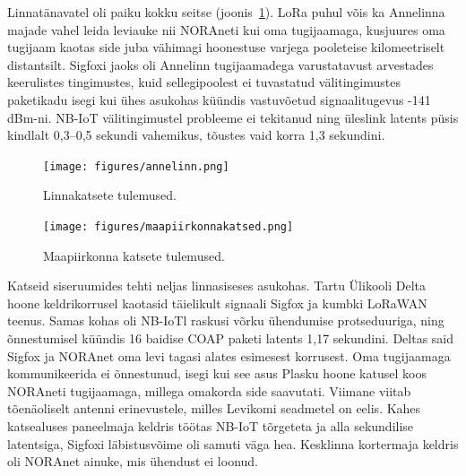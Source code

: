 \documentclass[12pt]{article}
\begin{document}
    Linnatänavatel oli paiku kokku seitse (joonis~\ref{fig:annelinn}).
    LoRa puhul võis ka Annelinna majade vahel leida leviauke nii NORAneti kui oma tugijaamaga, kusjuures oma tugijaam kaotas side juba vähimagi hoonestuse varjega pooleteise kilomeetriselt distantsilt.
    Sigfoxi jaoks oli Annelinn tugijaamadega varustatavust arvestades keerulistes tingimustes, kuid sellegipoolest ei tuvastatud välitingimustes paketikadu isegi kui ühes asukohas küündis vastuvõetud signaalitugevus -141 dBm-ni.
    NB-IoT välitingimustel probleeme ei tekitanud ning üleslink latents püsis kindlalt 0,3--0,5 sekundi vahemikus, tõustes vaid korra 1,3 sekundini.

    \begin{figure} [p]
        \begin{center}
            \vspace*{-0.5cm}
            \texttt{[image: figures/annelinn.png]}
            \caption{Linnakatsete tulemused.}
            \label{fig:annelinn}
        \end{center}
    \end{figure}

    \begin{figure} [p]
        \begin{center}
            \vspace*{-0.5cm}
            \texttt{[image: figures/maapiirkonnakatsed.png]}
            \caption{Maapiirkonna katsete tulemused.}
            \label{fig:maapiirkonnakatsed}
        \end{center}
    \end{figure}

    Katseid siseruumides tehti neljas linnasiseses asukohas.
    Tartu Ülikooli Delta hoone keldrikorrusel kaotasid täielikult signaali Sigfox ja kumbki LoRaWAN teenus.
    Samas kohas oli NB-IoTl raskusi võrku ühendumise protseduuriga, ning õnnestumisel küündis 16 baidise COAP paketi latents 1,17 sekundini.
    Deltas said Sigfox ja NORAnet oma levi tagasi alates esimesest korrusest.
    Oma tugijaamaga kommunikeerida ei õnnestunud, isegi kui see asus Plasku hoone katusel koos NORAneti tugijaamaga, millega omakorda side saavutati.
    Viimane viitab tõenäoliselt antenni erinevustele, milles Levikomi seadmetel on eelis.
    Kahes katsealuses paneelmaja keldris töötas NB-IoT tõrgeteta ja alla sekundilise latentsiga, Sigfoxi läbistusvõime oli samuti väga hea.
    Kesklinna kortermaja keldris oli NORAnet ainuke, mis ühendust ei loonud.
\end{document}
